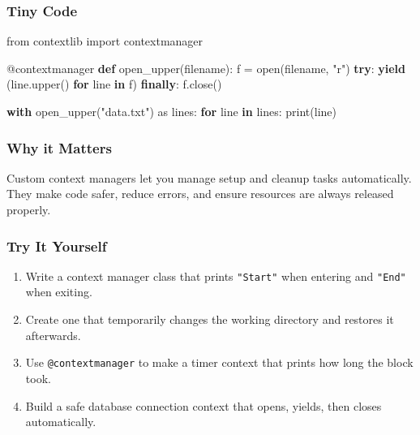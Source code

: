 \documentclass[
  letterpaper,
  DIV=11,
  numbers=noendperiod]{scrreprt}
\newenvironment{Shaded}{\begin{snugshade}}{\end{snugshade}}
\newcommand{\AttributeTok}[1]{\textcolor[rgb]{0.40,0.45,0.13}{#1}}
\newcommand{\BuiltInTok}[1]{\textcolor[rgb]{0.00,0.23,0.31}{#1}}
\newcommand{\ControlFlowTok}[1]{\textcolor[rgb]{0.00,0.23,0.31}{\textbf{#1}}}
\newcommand{\ImportTok}[1]{\textcolor[rgb]{0.00,0.46,0.62}{#1}}
\newcommand{\KeywordTok}[1]{\textcolor[rgb]{0.00,0.23,0.31}{\textbf{#1}}}
\newcommand{\NormalTok}[1]{\textcolor[rgb]{0.00,0.23,0.31}{#1}}
\newcommand{\OperatorTok}[1]{\textcolor[rgb]{0.37,0.37,0.37}{#1}}
\newcommand{\StringTok}[1]{\textcolor[rgb]{0.13,0.47,0.30}{#1}}
\providecommand{\tightlist}{%
  \setlength{\itemsep}{0pt}\setlength{\parskip}{0pt}}
\begin{document}
\subsubsection{Tiny Code}\label{tiny-code-86}

\begin{Shaded}
\begin{Highlighting}[]
\ImportTok{from}\NormalTok{ contextlib }\ImportTok{import}\NormalTok{ contextmanager}

\AttributeTok{@contextmanager}
\KeywordTok{def}\NormalTok{ open\_upper(filename):}
\NormalTok{    f }\OperatorTok{=} \BuiltInTok{open}\NormalTok{(filename, }\StringTok{"r"}\NormalTok{)}
    \ControlFlowTok{try}\NormalTok{:}
        \ControlFlowTok{yield}\NormalTok{ (line.upper() }\ControlFlowTok{for}\NormalTok{ line }\KeywordTok{in}\NormalTok{ f)}
    \ControlFlowTok{finally}\NormalTok{:}
\NormalTok{        f.close()}

\ControlFlowTok{with}\NormalTok{ open\_upper(}\StringTok{"data.txt"}\NormalTok{) }\ImportTok{as}\NormalTok{ lines:}
    \ControlFlowTok{for}\NormalTok{ line }\KeywordTok{in}\NormalTok{ lines:}
        \BuiltInTok{print}\NormalTok{(line)}
\end{Highlighting}
\end{Shaded}

\subsubsection{Why it Matters}\label{why-it-matters-86}

Custom context managers let you manage setup and cleanup tasks
automatically. They make code safer, reduce errors, and ensure resources
are always released properly.

\subsubsection{Try It Yourself}\label{try-it-yourself-86}

\begin{enumerate}
\def\labelenumi{\arabic{enumi}.}
\tightlist
\item
  Write a context manager class that prints \texttt{"Start"} when
  entering and \texttt{"End"} when exiting.
\item
  Create one that temporarily changes the working directory and restores
  it afterwards.
\item
  Use \texttt{@contextmanager} to make a timer context that prints how
  long the block took.
\item
  Build a safe database connection context that opens, yields, then
  closes automatically.
\end{enumerate}
\end{document}
